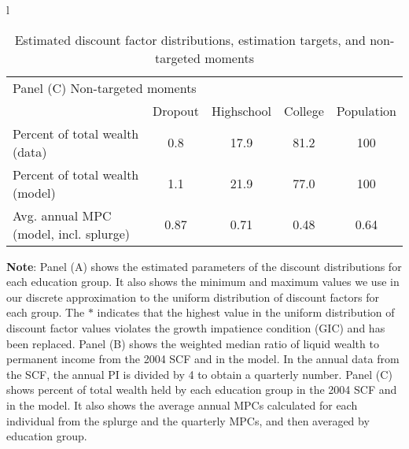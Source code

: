 \documentclass[\econtexRoot/HAFiscal]{subfiles}
\begin{document}
\begin{table}[tp]
\begin{center}
\begin{tabular}{l}
      \begin{tabular}{lcccc}
        \multicolumn{5}{l}{Panel (C) Non-targeted moments} \\ 
        & Dropout & Highschool & College & Population \\ \midrule
        Percent of total wealth (data) & 0.8 & 17.9 & 81.2 & 100 \\
        Percent of total wealth (model) & 1.1 & 21.9 & 77.0 & 100 \\
        Avg. annual MPC (model, incl. splurge) & 0.87 & 0.71 & 0.48 & 0.64
        \\ \bottomrule 
      \end{tabular}
    \end{tabular}
    \caption{Estimated discount factor distributions, estimation targets, and non-targeted moments}
    \notinsubfile{\label{tab:estimBetas}}
    \parbox{16cm}{\small \vspace{.15cm} \textbf{Note}: Panel (A) shows the estimated parameters of the discount distributions for each education group.
It also shows the minimum and maximum values we use in our discrete approximation to the uniform distribution of discount factors for each group.
The $*$ indicates that the highest value in the uniform distribution of discount factor values violates the growth impatience condition (GIC) and has been replaced.
Panel (B) shows the weighted median ratio of liquid wealth to permanent income from the 2004 SCF and in the model.
In the annual data from the SCF, the annual PI is divided by 4 to obtain a quarterly number.
Panel (C) shows percent of total wealth held by each education group in the 2004 SCF and in the model.
It also shows the average annual MPCs calculated for each individual from the splurge and the quarterly MPCs, and then averaged by education group.\normalsize}
  \end{center}
\end{table}
\end{document}
